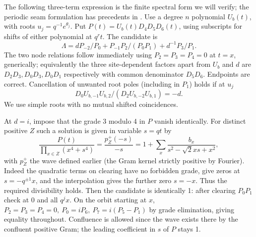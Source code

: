 \documentclass[11pt]{article}
\numberwithin{equation}{section}
\theoremstyle{definition}\newtheorem{definition}[theorem]{Definition}
\theoremstyle{remark}\newtheorem{remark}[theorem]{Remark}
\begin{document}
The following three-term expression is the finite spectral form we will verify; the periodic seam formulation has precedents in \cite[Section~2]{ZhouBatchelor1997}. Use a degree \(n\) polynomial \(U_b(t)\), with roots \(u_j=q^{-1}e^{\theta_j}\). Put \(P(t)=U_b(t)D_4D_5D_6(t)\), using subscripts for shifts of either polynomial at \(q^r t\). The candidate is
\[
 \Lambda= d P_{-2}/P_0+P_{-1}P_2/(P_0P_1)+d^{-1}P_3/P_1.
\]
The two node relations follow immediately using \(P_2=P_3=P_4=0\) at \(t=x\), generically; equivalently the three site-dependent factors apart from \(U_b\) and \(d\) are \(D_2D_3,D_0D_3,D_0D_1\) respectively with common denominator \(D_5D_6\). Endpoints are correct. Cancellation of unwanted root poles (including in \(P_1\)) holds if at \(u_j\)
\[
 D_0 U_{b,-1}U_{b,2}/(D_2 U_{b,-2} U_{b,1})=-d .
\]
We use simple roots with no mutual shifted coincidences.

At \(d=i\), impose that the grade 3 modulo 4 in \(P\) vanish identically. For distinct positive \(Z\) such a solution is given in variable \(s=qt\) by
\[
 \frac{P(t)}{\prod_{x\in Z}(x^4+s^4)}=
 \frac{p_Z^+(-s)}{-s}=1+\sum_x \frac{b_x}{s^2-\sqrt2 x s+x^2},
\]
with \(p_Z^+\) the wave defined earlier (the Gram kernel strictly positive by Fourier). Indeed the quadratic terms on clearing have no forbidden grade, give zeros at \(s=-q^{\pm1}x\), and the interpolation gives the further zero \(s=-x\). Thus the required divisibility holds. Then the candidate is identically 1: after clearing \(P_0P_1\) check at \(0\) and all \(q^j x\). On the orbit starting at \(x\), \(P_2=P_3=P_4=0,\ P_0=iP_6,\ P_7=i(P_5-P_1)\) by grade elimination, giving equality throughout. Confluence is allowed since the wave exists there by the confluent positive Gram; the leading coefficient in \(s\) of \(P\) stays 1.
\end{document}

